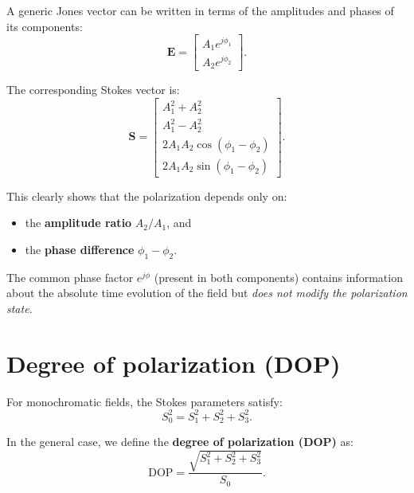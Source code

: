 A generic Jones vector can be written in terms of the amplitudes and phases of its components:
\begin{equation}
    \mathbf{E} =
    \begin{bmatrix}
        A_1 e^{j\phi_1}\\[4pt]
        A_2 e^{j\phi_2}
    \end{bmatrix}.
\end{equation}

The corresponding Stokes vector is:
\begin{equation}
    \mathbf{S} =
    \begin{bmatrix}
        A_1^2 + A_2^2\\[4pt]
        A_1^2 - A_2^2\\[4pt]
        2A_1A_2\cos(\phi_1 - \phi_2)\\[4pt]
        2A_1A_2\sin(\phi_1 - \phi_2)
    \end{bmatrix}.
\end{equation}

This clearly shows that the polarization depends only on:
\begin{itemize}
    \item the \textbf{amplitude ratio} $A_2/A_1$, and
    \item the \textbf{phase difference} $\phi_1 - \phi_2$.
\end{itemize}

The common phase factor $e^{j\phi}$ (present in both components) contains information about the absolute time evolution of the field but \emph{does not modify the polarization state}.



\section{Degree of polarization (DOP)}

For monochromatic fields, the Stokes parameters satisfy:
\begin{equation}
    S_0^2 = S_1^2 + S_2^2 + S_3^2.
\end{equation}

In the general case, we define the \textbf{degree of polarization (DOP)} as:
\begin{equation}
    \mathrm{DOP} = \frac{\sqrt{S_1^2 + S_2^2 + S_3^2}}{S_0}.
\end{equation}

